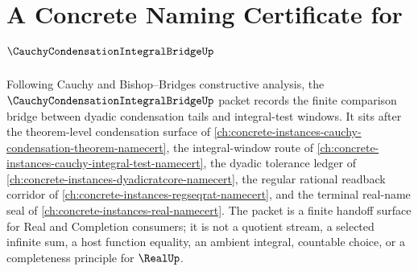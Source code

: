 \chapter{A Concrete Naming Certificate for $\CauchyCondensationIntegralBridgeUp$}
\label{ch:concrete-instances-cauchy-condensation-integral-bridge-namecert}

Following Cauchy and Bishop--Bridges constructive analysis, the $\CauchyCondensationIntegralBridgeUp$ packet records the finite comparison bridge between dyadic condensation tails and integral-test windows. It sits after the theorem-level condensation surface of \autoref{ch:concrete-instances-cauchy-condensation-theorem-namecert}, the integral-window route of \autoref{ch:concrete-instances-cauchy-integral-test-namecert}, the dyadic tolerance ledger of \autoref{ch:concrete-instances-dyadicratcore-namecert}, the regular rational readback corridor of \autoref{ch:concrete-instances-regseqrat-namecert}, and the terminal real-name seal of \autoref{ch:concrete-instances-real-namecert}. The packet is a finite handoff surface for Real and Completion consumers; it is not a quotient stream, a selected infinite sum, a host function equality, an ambient integral, countable choice, or a completeness principle for $\RealUp$.

